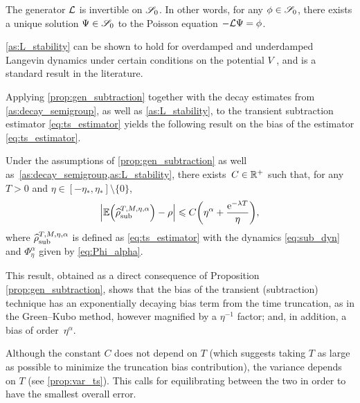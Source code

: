 \begin{assumption}
\label{as:L_stability}
%
The generator $\L$ is invertible on $\S_0$. In other words, for any $\phi\in\S_0$, there exists a unique solution $\Psi \in \S_0$ to the Poisson equation $-\L\Psi = \phi$.
\end{assumption}

\cref{as:L_stability} can be shown to hold for overdamped and underdamped Langevin dynamics under certain conditions on the potential $V$ \cite{talay2002,kopec_ovd,kopec_lang}, and is a standard result in the literature.

Applying \cref{prop:gen_subtraction} together with the decay estimates from \cref{as:decay_semigroup}, as well as \cref{as:L_stability}, to the transient subtraction estimator \eqref{eq:ts_estimator} yields the following result on the bias of the estimator \eqref{eq:ts_estimator}.

\begin{corollary}
\label{cor:gk_equiv}
Under the assumptions of \cref{prop:gen_subtraction} as well as~\cref{as:decay_semigroup,as:L_stability}, there exists~$C\in\R^+$ such that, for any $T>0$ and $\eta \in [-\eta_*, \eta_*] \setminus \{0\}$,
\begin{equation}
	\left|\E\paren*{\aTSest} - \rho\right| \leq C\paren*{\eta^\alpha + \frac{\e^{-\lambda T}}{\eta}},
\label{eq:gk_cor_statement}
\end{equation}
%
where $\aTSest$ is defined as \eqref{eq:ts_estimator} with the dynamics \eqref{eq:sub_dyn} and $\Phi_\eta^\alpha$ given by \eqref{eq:Phi_alpha}.
%
\end{corollary}

This result, obtained as a direct consequence of Proposition \ref{prop:gen_subtraction}, shows that the bias of the transient (subtraction) technique has an exponentially decaying bias term from the time truncation, as in the Green--Kubo method, however magnified by a $\eta^{-1}$ factor; and, in addition, a bias of order~$\eta^\alpha$.

%
%
\begin{remark}
	Although the constant $C$ does not depend on $T$ (which suggests taking $T$ as large as possible to minimize the truncation bias contribution), the variance depends on $T$ (see \cref{prop:var_ts}). This calls for equilibrating between the two in order to have the smallest overall error.
\end{remark}

